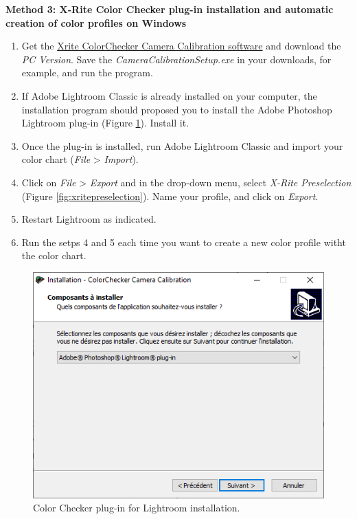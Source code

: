 \documentclass[
]{book}
\begin{document}
\textbf{Method 3: X-Rite Color Checker plug-in installation and automatic
creation of color profiles on Windows}

\begin{enumerate}
\def\labelenumi{\arabic{enumi}.}
\item
  Get the \href{https://xritephoto.com/ph_product_overview.aspx?ID=938\&Action=Support\&SoftwareID=2030}{Xrite ColorChecker Camera Calibration
  software}
  and download the \emph{PC Version}. Save the \emph{CameraCalibrationSetup.exe}
  in your downloads, for example, and run the program.
\item
  If Adobe Lightroom Classic is already installed on your computer,
  the installation program should proposed you to install the Adobe
  Photoshop Lightroom plug-in (Figure \ref{fig:ColorCheckerplugin}). Install it.
\item
  Once the plug-in is installed, run Adobe Lightroom Classic and
  import your color chart (\emph{File} \textgreater{} \emph{Import}).
\item
  Click on \emph{File} \textgreater{} \emph{Export} and in the drop-down menu, select
  \emph{X-Rite Preselection} (Figure \ref{fig:xritepreselection}). Name your profile, and click on
  \emph{Export}.
\item
  Restart Lightroom as indicated.
\item
  Run the setps 4 and 5 each time you want to create a new color
  profile witht the color chart.
\end{enumerate}

\begin{figure}

{\centering \includegraphics[width=0.8\linewidth]{Figures/color_checker_plug_in_win} 

}

\caption{Color Checker plug-in for Lightroom installation.}\label{fig:ColorCheckerplugin}
\end{figure}
\end{document}
